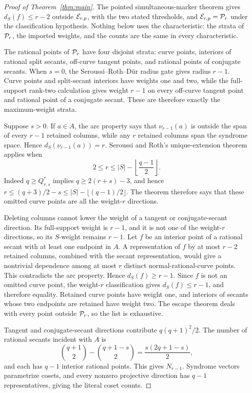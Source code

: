 \begin{proof}[Proof of Theorem~\ref{thm:main}]
The pointed simultaneous-marker theorem gives
\(d_S(f)\leq r-2\) outside \(\mathcal E_{r,p}\), with the two stated thresholds,
and \(\mathcal E_{r,p}=\mathcal P_r\) under the classification hypothesis.  Nothing below
uses the characteristic: the strata of \(\mathcal P_r\), the imported weights, and
the counts are the same in every characteristic.

The rational points of \(\mathcal P_r\) have four disjoint strata: curve points,
interiors of rational split secants, off-curve tangent points, and rational
points of conjugate secants.  When \(s=0\), the Seroussi--Roth--D\"ur radius
gate gives radius \(r-1\).  Curve points and split-secant interiors have
weights one and two, while the full-support rank-two calculation
\cite[Thms.~I.4--I.6]{ZWK2020} gives weight \(r-1\) on every off-curve tangent
point and rational point of a conjugate secant.  These are therefore exactly
the maximum-weight strata.

Suppose \(s>0\).  If \(a\in A\), the arc property says that
\(\nu_{r-1}(a)\) is outside the span of every \(r-1\) retained columns, while
any \(r\) retained columns span the syndrome space.  Hence
\(d_S(\nu_{r-1}(a))=r\).  Seroussi and Roth's unique-extension theorem
\cite[Thm.~1]{SeroussiRoth1986} applies when
\[
 2\leq r\leq |S|-\left\lfloor\frac{q-1}{2}\right\rfloor.
\]
Indeed \(q\geq Q^*_{r,s}\) implies \(q\geq2(r+s)-3\), and hence
\(r\leq(q+3)/2-s\leq |S|-\lfloor(q-1)/2\rfloor\).  The theorem therefore
says that these omitted curve points are all the weight-\(r\) directions.

Deleting columns cannot lower the weight of a tangent or conjugate-secant
direction.  Its full-support weight is \(r-1\), and it is not one of the
weight-\(r\) directions, so its \(S\)-weight remains \(r-1\).  Let \(f\) be an
interior point of a rational secant with at least one endpoint in \(A\).  A
representation of \(f\) by at most \(r-2\) retained columns, combined with
the secant representation, would give a nontrivial dependence among at most
\(r\) distinct normal-rational-curve points.  This contradicts the arc
property.  Hence \(d_S(f)\geq r-1\).  Since \(f\) is not an omitted curve
point, the weight-\(r\) classification gives \(d_S(f)\leq r-1\), and therefore
equality.  Retained curve points have weight one, and interiors of secants
whose two endpoints are retained have weight two.  The escape theorem deals
with every point outside \(\mathcal P_r\), so the list is exhaustive.

Tangent and conjugate-secant directions contribute
\(q(q+1)^2/2\).  The number of rational secants incident with \(A\) is
\[
 \binom{q+1}{2}-\binom{q+1-s}{2}=\frac{s(2q+1-s)}2,
\]
and each has \(q-1\) interior rational points.  This gives \(N_{r-1}\).
Syndrome vectors parametrize cosets, and every nonzero projective direction
has \(q-1\) representatives, giving the literal coset counts.
\end{proof}

